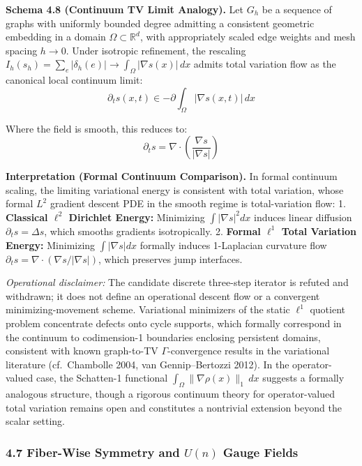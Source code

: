 \documentclass[
]{article}
\begin{document}
\textbf{Schema 4.8 (Continuum TV Limit Analogy).} Let \(G_h\) be a sequence of graphs with uniformly bounded degree admitting a consistent geometric embedding in a domain \(\Omega \subset \mathbb{R}^d\), with appropriately scaled edge weights and mesh spacing \(h \to 0\). Under isotropic refinement, the rescaling \(I_h(s_h) = \sum_e |\delta_h(e)| \to \int_\Omega |\nabla s(x)| \, dx\) admits total variation flow as the canonical local continuum limit:
\[ \partial_t s(x,t) \in -\partial \int_\Omega |\nabla s(x,t)| \, dx \]

Where the field is smooth, this reduces to:
\[ \partial_t s = \nabla \cdot \left( \frac{\nabla s}{|\nabla s|} \right) \]

\textbf{Interpretation (Formal Continuum Comparison).} In formal continuum scaling, the limiting variational energy is consistent with total variation, whose formal \(L^2\) gradient descent PDE in the smooth regime is total-variation flow:
1. \textbf{Classical \(\ell^2\) Dirichlet Energy:} Minimizing \(\int |\nabla s|^2 dx\) induces linear diffusion \(\partial_t s = \Delta s\), which smooths gradients isotropically.
2. \textbf{Formal \(\ell^1\) Total Variation Energy:} Minimizing \(\int |\nabla s| dx\) formally induces 1-Laplacian curvature flow \(\partial_t s = \nabla \cdot (\nabla s / |\nabla s|)\), which preserves jump interfaces.

\emph{Operational disclaimer:} The candidate discrete three-step iterator is refuted and withdrawn; it does not define an operational descent flow or a convergent minimizing-movement scheme. Variational minimizers of the static \(\ell^1\) quotient problem concentrate defects onto cycle supports, which formally correspond in the continuum to codimension-1 boundaries enclosing persistent domains, consistent with known graph-to-TV \(\Gamma\)-convergence results in the variational literature (cf.~Chambolle 2004, van Gennip--Bertozzi 2012). In the operator-valued case, the Schatten-1 functional \(\int_\Omega \|\nabla \rho(x)\|_1 \, dx\) suggests a formally analogous structure, though a rigorous continuum theory for operator-valued total variation remains open and constitutes a nontrivial extension beyond the scalar setting.

\subsubsection{\texorpdfstring{4.7 Fiber-Wise Symmetry and \(U(n)\) Gauge Fields}{4.7 Fiber-Wise Symmetry and U(n) Gauge Fields}}\label{fiber-wise-symmetry-and-un-gauge-fields}
\end{document}

